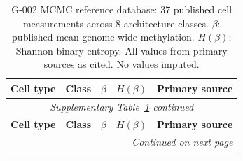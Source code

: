 \documentclass[12pt,a4paper]{article}
\begin{document}
\begin{longtable}{p{4.2cm}p{2.0cm}p{1.0cm}p{1.0cm}p{5.5cm}}
\caption{G-002 MCMC reference database: 37 published cell measurements across
8 architecture classes. $\beta$: published mean genome-wide methylation.
$H(\beta)$: Shannon binary entropy. All values from primary sources as cited.
No values imputed.}
\label{tab:database}\\
\toprule
\textbf{Cell type} & \textbf{Class} & \textbf{$\beta$} & \textbf{$H(\beta)$} & \textbf{Primary source} \\
\midrule
\endfirsthead
\multicolumn{5}{c}{\small\itshape Supplementary Table~\ref{tab:database} continued}\\
\toprule
\textbf{Cell type} & \textbf{Class} & \textbf{$\beta$} & \textbf{$H(\beta)$} & \textbf{Primary source} \\
\midrule
\endhead
\midrule\multicolumn{5}{r}{\small\itshape Continued on next page}\\
\endfoot
\bottomrule
\endlastfoot


\end{longtable}
\end{document}

